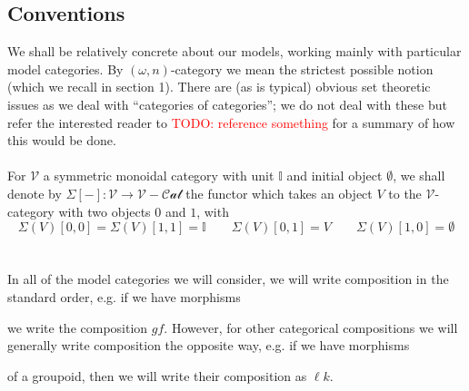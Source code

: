 \documentclass[12pt]{article}
\theoremstyle{definition}
\newcommand{\TODO}[1]{\textcolor{red}{TODO: {#1}}}
\newcommand{\V}{\mathcal{V}}
\newcommand{\sus}{\Sigma}
\begin{document}
\subsection{Conventions}
	We shall be relatively concrete about our models, working mainly with particular model categories.
	By $(\omega,n)$-category we mean the strictest possible notion (which we recall in section 1). 
	There are (as is typical) obvious set theoretic issues as we deal with ``categories of categories''; we do not deal with these but refer the interested reader to \TODO{reference something} for a summary of how this would be done. 
	\\\\
	For $\V$ a symmetric monoidal category with unit $\mathbb{I}$ and initial object $\emptyset$, we shall denote by $\sus[-]: \V \to \V-\mathcal{Cat}$ the functor which takes an object $V$ to the $\V$-category with two objects $0$ and $1$, with
	$$\sus(V)[0,0] = \sus(V)[1,1] = \mathbb{I} \quad \quad \sus(V)[0,1] = V \quad \quad \sus(V)[1,0] = \emptyset$$
	\\\\
	In all of the model categories we will consider, we will write composition in the standard order, e.g. if we have morphisms  we write the composition $gf$. 
	However, for other categorical compositions we will generally write composition the opposite way, e.g. if we have morphisms  of a groupoid, then we will write their composition as $\ell k$. 
\end{document}
